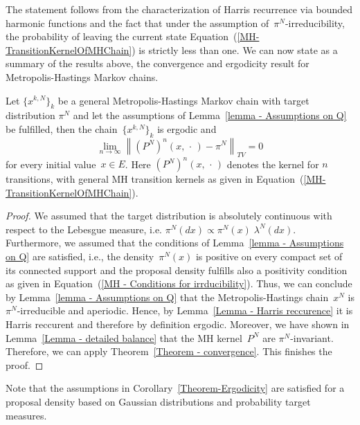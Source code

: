 The statement follows from the characterization of Harris recurrence via bounded harmonic functions and the fact that under the assumption of~$\pi^{N}$-irreducibility, the probability of leaving the current state Equation~(\ref{MH-TransitionKernelOfMHChain}) is strictly less than one. We can now state as a summary of the  results above, the convergence and ergodicity result for Metropolis-Hastings Markov chains.

\begin{cor}
\label{Theorem-Ergodicity}
 Let  $ \{ x^{k,N} \}_{k} $ be a general Metropolis-Hastings Markov chain with target distribution $ \pi^{N} $ and let the assumptions of Lemma~\ref{lemma - Assumptions on Q} be fulfilled,
 then the chain~$ \{ x^{k,N} \}_{k} $ is ergodic and
  \begin{equation}
  \label{Theorem-Ergodicity-Statement2}
   \lim_{n \to \infty} \left\|  \left( P^{N} \right)^n (x, \, \cdot \, ) -  \pi^{N}   \right\|_{TV} = 0
  \end{equation}
  for every initial value~$x \in E$. Here $ \left( P^{N} \right)^n (x, \, \cdot \, ) $ denotes the kernel for $n$ transitions, with general MH transition kernels as given in Equation~(\ref{MH-TransitionKernelOfMHChain}).

\end{cor}


\begin{proof}
 We assumed that the target distribution is absolutely continuous with respect to the Lebesgue measure, i.e. $ \pi^{N}(dx) \varpropto \pi^{N}(x) \; \lambda^{N}(dx) $. Furthermore, we assumed that the conditions of Lemma~\ref{lemma - Assumptions on Q} are satisfied, i.e., the density~$\pi^N(x)$ is positive on every compact set of its connected support and the proposal density fulfills also a positivity condition as given in Equation~(\ref{MH - Conditions for irrducibility}). Thus, we can conclude by Lemma~\ref{lemma - Assumptions on Q} that the Metropolis-Hastings chain~$x^{N}$ is $\pi^{N}$-irreducible and aperiodic. Hence, by Lemma~\ref{Lemma - Harris reccurence} it is Harris reccurent and therefore by definition ergodic. Moreover, we have shown in Lemma~\ref{Lemma - detailed balance} that the MH kernel~$P^N$ are $\pi^{N}$-invariant. Therefore, we can apply Theorem~\ref{Theorem - convergence}. This finishes the proof.
\end{proof}

Note that the assumptions in Corollary~\ref{Theorem-Ergodicity} are satisfied for a proposal density based on Gaussian distributions and probability target measures.





